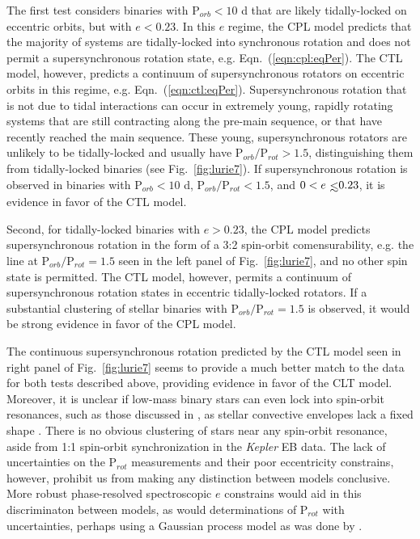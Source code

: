 \documentclass[twocolumn]{aastex61}
\def\lsim{~\rlap{$<$}{\lower 1.0ex\hbox{$\sim$}}}
\newcommand{\kepler}[0]{\textit{Kepler}\xspace}
\begin{document}
The first test considers binaries with P$_{orb} < 10$ d that are likely tidally-locked on eccentric orbits, but with $e < 0.23$.  In this $e$ regime, the CPL model predicts that the majority of systems are tidally-locked into synchronous rotation and does not permit a supersynchronous rotation state, e.g. Eqn.~(\ref{eqn:cpl:eqPer}). The CTL model, however, predicts a continuum of supersynchronous rotators on eccentric orbits in this regime, e.g. Eqn.~(\ref{eqn:ctl:eqPer}). Supersynchronous rotation that is not due to tidal interactions can occur in extremely young, rapidly rotating systems that are still contracting along the pre-main sequence, or that have recently reached the main sequence.  These young, supersynchronous rotators are unlikely to be tidally-locked and usually have P$_{orb}/$P$_{rot} > 1.5$, distinguishing them from tidally-locked binaries (see Fig.~\ref{fig:lurie7}).   If supersynchronous rotation is observed in binaries with P$_{orb} < 10$ d, P$_{orb}/$P$_{rot} < 1.5$, and $0 < e \lsim 0.23$, it is evidence in favor of the CTL model. 

Second, for tidally-locked binaries with $e > 0.23$, the CPL model predicts supersynchronous rotation in the form of a 3:2 spin-orbit comensurability, e.g. the line at P$_{orb}/$P$_{rot} = 1.5$ seen in the left panel of Fig.~\ref{fig:lurie7}, and no other spin state is permitted. The CTL model, however, permits a continuum of supersynchronous rotation states in eccentric tidally-locked rotators. If a substantial clustering of stellar binaries with P$_{orb}/$P$_{rot} = 1.5$ is observed, it would be strong evidence in favor of the CPL model.

The continuous supersynchronous rotation predicted by the CTL model seen in right panel of Fig.~\ref{fig:lurie7} seems to provide a much better match to the \citet{Lurie2017} data for both tests described above, providing evidence in favor of the CLT model. Moreover, it is unclear if low-mass binary stars can even lock into spin-orbit resonances, such as those discussed in \citet{Rodriguez2012}, as stellar convective envelopes lack a fixed shape \citep{Burkart2014,Lurie2017}.  There is no obvious clustering of stars near any spin-orbit resonance, aside from 1:1 spin-orbit synchronization in the \citet{Lurie2017} \kepler EB data. The lack of uncertainties on the \citet{Lurie2017} P$_{rot}$ measurements and their poor eccentricity constrains, however, prohibit us from making any distinction between models conclusive.  More robust phase-resolved spectroscopic $e$ constrains would aid in this discriminaton between models, as would determinations of P$_{rot}$ with uncertainties, perhaps using a Gaussian process model as was done by \citet{Angus2018}.  
\end{document}
